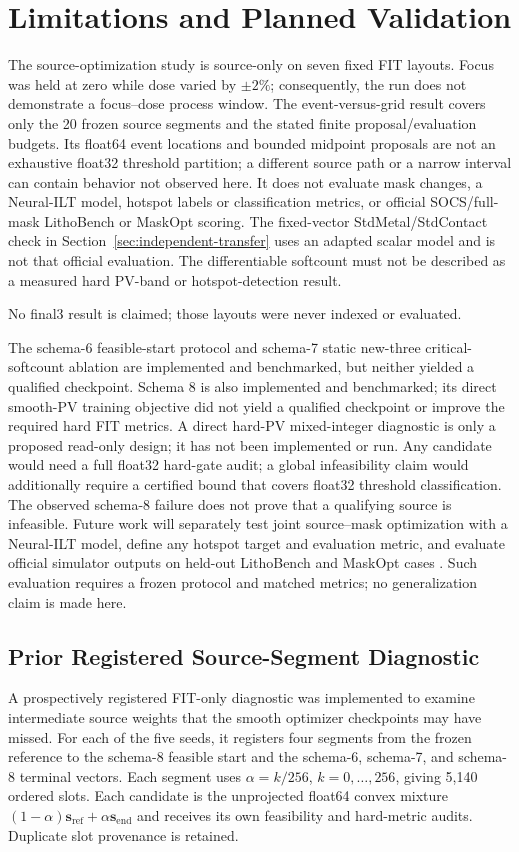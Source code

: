 \documentclass[conference]{IEEEtran}
\begin{document}
\section{Limitations and Planned Validation}
\label{sec:limits}
The source-optimization study is source-only on seven fixed FIT layouts. Focus was held at zero while dose varied by $\pm2\%$; consequently, the run does not demonstrate a focus--dose process window. The event-versus-grid result covers only the 20 frozen source segments and the stated finite proposal/evaluation budgets. Its float64 event locations and bounded midpoint proposals are not an exhaustive float32 threshold partition; a different source path or a narrow interval can contain behavior not observed here. It does not evaluate mask changes, a Neural-ILT model, hotspot labels or classification metrics, or official SOCS/full-mask LithoBench or MaskOpt scoring. The fixed-vector StdMetal/StdContact check in Section~\ref{sec:independent-transfer} uses an adapted scalar model and is not that official evaluation. The differentiable softcount must not be described as a measured hard PV-band or hotspot-detection result.

No final3 result is claimed; those layouts were never indexed or evaluated.

The schema-6 feasible-start protocol and schema-7 static new-three critical-softcount ablation are implemented and benchmarked, but neither yielded a qualified checkpoint. Schema 8 is also implemented and benchmarked; its direct smooth-PV training objective did not yield a qualified checkpoint or improve the required hard FIT metrics. A direct hard-PV mixed-integer diagnostic is only a proposed read-only design; it has not been implemented or run. Any candidate would need a full float32 hard-gate audit; a global infeasibility claim would additionally require a certified bound that covers float32 threshold classification. The observed schema-8 failure does not prove that a qualifying source is infeasible. Future work will separately test joint source--mask optimization with a Neural-ILT model, define any hotspot target and evaluation metric, and evaluate official simulator outputs on held-out LithoBench and MaskOpt cases \cite{lithobench,maskopt}. Such evaluation requires a frozen protocol and matched metrics; no generalization claim is made here.


\subsection{Prior Registered Source-Segment Diagnostic}
A prospectively registered FIT-only diagnostic was implemented to examine intermediate source weights that the smooth optimizer checkpoints may have missed. For each of the five seeds, it registers four segments from the frozen reference to the schema-8 feasible start and the schema-6, schema-7, and schema-8 terminal vectors. Each segment uses $\alpha=k/256$, $k=0,\ldots,256$, giving 5,140 ordered slots. Each candidate is the unprojected float64 convex mixture $(1-\alpha)\mathbf{s}_{\mathrm{ref}}+\alpha\mathbf{s}_{\mathrm{end}}$ and receives its own feasibility and hard-metric audits. Duplicate slot provenance is retained.
\end{document}
